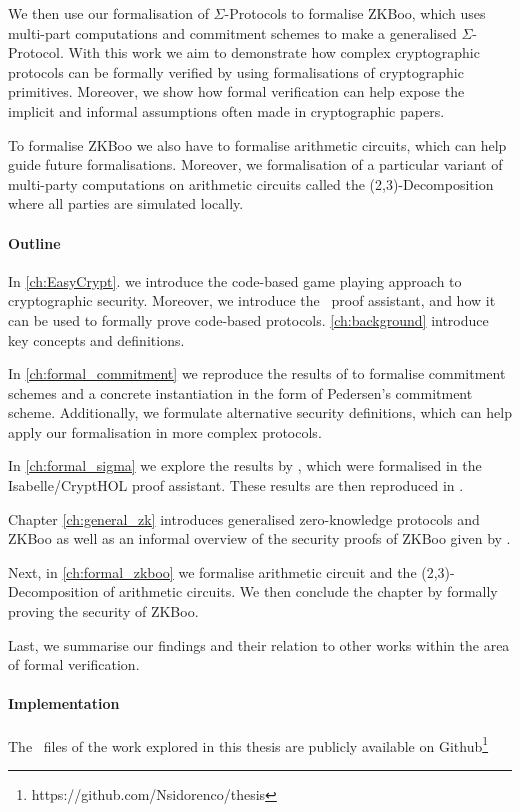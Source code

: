 We then use our formalisation of $\Sigma$-Protocols to formalise ZKBoo, which
uses multi-part computations and commitment schemes to make
a generalised $\Sigma$-Protocol. With this work we aim to demonstrate how complex
cryptographic protocols can be formally verified by using formalisations of
cryptographic primitives. Moreover, we show how formal verification can help expose
the implicit and informal assumptions often made in cryptographic papers.

To formalise ZKBoo we also have to formalise arithmetic circuits, which can help
guide future formalisations. Moreover, we formalisation of a particular variant
of multi-party computations on arithmetic circuits called the
(2,3)-Decomposition where all parties are simulated locally.


\paragraph{Outline}
In \autoref{ch:EasyCrypt}. we introduce the code-based game playing approach to
cryptographic security. Moreover, we introduce the \easycrypt\ proof assistant,
and how it can be used to formally prove code-based protocols.
\autoref{ch:background} introduce key concepts and definitions.

In \autoref{ch:formal_commitment} we reproduce the results of
\cite{DBLP:journals/corr/MetereD17} to formalise commitment schemes and a
concrete instantiation in the form of Pedersen's commitment scheme.
Additionally, we formulate alternative security definitions, which can help
apply our formalisation in more complex protocols.

In \autoref{ch:formal_sigma} we explore the results by
\cite{cryptoeprint:2019:1185}, which were formalised in the Isabelle/CryptHOL
proof assistant. These results are then reproduced in \easycrypt.

Chapter \ref{ch:general_zk} introduces generalised zero-knowledge protocols and
ZKBoo as well as an informal overview of the security proofs of ZKBoo given by \cite{zkboo}.

Next, in \autoref{ch:formal_zkboo} we formalise arithmetic circuit and the
(2,3)-Decomposition of arithmetic circuits. We then conclude the chapter by
formally proving the security of ZKBoo.

Last, we summarise our findings and their relation to other works within the
area of formal verification.

\paragraph{Implementation}
The \easycrypt\ files of the work explored in this thesis
are publicly available on Github\footnote{https://github.com/Nsidorenco/thesis}

